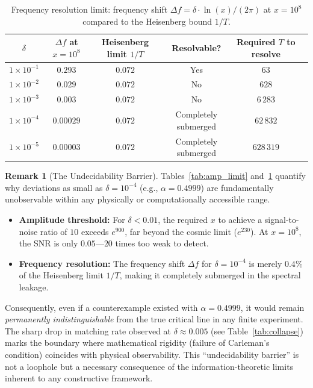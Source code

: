 \documentclass[12pt,a4paper]{article}
\theoremstyle{definition}
\newtheorem{remark}{Remark}[section]
\theoremstyle{plain}
\theoremstyle{remark}
\begin{document}
\begin{table}[H]
\centering
\caption{Frequency resolution limit: frequency shift $\Delta f = \delta \cdot \ln(x)/(2\pi)$ at $x=10^8$ compared to the Heisenberg bound $1/T$.}
\label{tab:freq_limit}
\begin{tabular}{@{}cccccc@{}} \toprule
$\delta$ & $\Delta f$ at $x=10^8$ & Heisenberg limit $1/T$ & Resolvable? & Required $T$ to resolve \\ \midrule
$1\times10^{-1}$ & $0.293$ & $0.072$ & Yes  & $63$   \\
$1\times10^{-2}$ & $0.029$ & $0.072$ & No   & $628$  \\
$1\times10^{-3}$ & $0.003$ & $0.072$ & No   & $6\,283$ \\
$1\times10^{-4}$ & $0.00029$ & $0.072$ & Completely submerged & $62\,832$ \\
$1\times10^{-5}$ & $0.00003$ & $0.072$ & Completely submerged & $628\,319$ \\ \bottomrule
\end{tabular}
\end{table}

\begin{remark}[The Undecidability Barrier]\label{rem:undecidability}
Tables~\ref{tab:amp_limit} and~\ref{tab:freq_limit} quantify why deviations as small as $\delta = 10^{-4}$ (e.g., $\alpha = 0.4999$) are fundamentally unobservable within any physically or computationally accessible range. 
\begin{itemize}
    \item \textbf{Amplitude threshold:} For $\delta < 0.01$, the required $x$ to achieve a signal-to-noise ratio of $10$ exceeds $e^{900}$, far beyond the cosmic limit ($e^{230}$). At $x=10^8$, the SNR is only $0.05$---$20$ times too weak to detect.
    \item \textbf{Frequency resolution:} The frequency shift $\Delta f$ for $\delta = 10^{-4}$ is merely $0.4\%$ of the Heisenberg limit $1/T$, making it completely submerged in the spectral leakage.
\end{itemize}
Consequently, even if a counterexample existed with $\alpha = 0.4999$, it would remain \textit{permanently indistinguishable} from the true critical line in any finite experiment. The sharp drop in matching rate observed at $\delta \approx 0.005$ (see Table~\ref{tab:collapse}) marks the boundary where mathematical rigidity (failure of Carleman's condition) coincides with physical observability. This ``undecidability barrier'' is not a loophole but a necessary consequence of the information-theoretic limits inherent to any constructive framework.
\end{remark}
\end{document}
